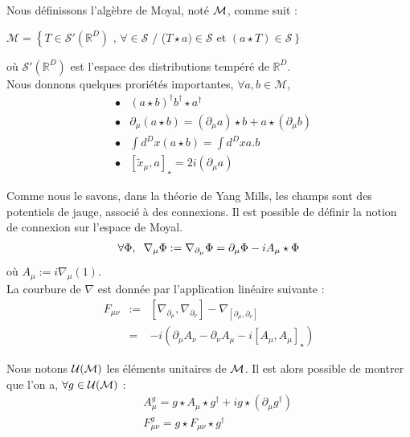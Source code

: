 \documentclass[a4paper,11pt]{article}
\theoremstyle{plain}
\theoremstyle{definition}
\theoremstyle{remark}
\numberwithin{equation}{section}
\numberwithin{equation}{subsection}
\numberwithin{figure}{section}
\begin{document}
\noindent
Nous définissons l'algèbre de Moyal, noté $\cal{M}$, comme suit :
\begin{center}
 $\mathcal{M}  =  \left \{ \right. T \in \mathcal{S}'(\mathbb{R}^{D})$ ,  $\forall \in \mathcal{S}$ /  ($T \star  a) \in \mathcal{S}$   
et $(a \star  T) \in \mathcal{S} \left.  \right \}$
\end{center}
où  $\mathcal{S}'(\mathbb{R}^{D})$ est l'espace des distributions tempéré de $\mathbb{R}^{D}$.\\

\noindent
Nous donnons quelques proriétés importantes, $\forall a,b \in \mathcal{M}$,
\begin{eqnarray}
 &\bullet& (a \star b )^{\dagger}  b^{\dagger}  \star  a^{\dagger}  \\
 &\bullet& \partial_{\mu} (a \star b) = (\partial_{\mu}a) \star b  +  a \star  (\partial_{\mu} b) \\
 &\bullet& \int d^{D}x (a\star b) = \int d^{D}x a.b \\
 &\bullet& [ \tilde{x}_{\mu} ,a ]_{\star} = 2i ( \partial_{\mu} a)
\end{eqnarray}

\noindent
Comme nous le savons, dans la théorie de Yang Mills, les champs sont des potentiels de jauge, associé à des connexions. Il est possible de 
définir la notion de connexion sur l'espace de Moyal.
\begin{eqnarray}
 \forall \Phi, \hspace{2mm}  \nabla_{\mu} \Phi :=   \nabla_{\partial_{\mu}} \Phi  = \partial_{\mu} \Phi - iA_{\mu} \star  \Phi
\end{eqnarray}
où  $A_{\mu} := i \nabla_{\mu}(1)$.\\

\noindent
La courbure de $\nabla$ est donnée par l'application linéaire suivante :
\begin{eqnarray}
 F_{\mu \nu}  &:=&  [ \nabla_{\partial_{\mu}}  , \nabla_{\partial_{\nu}}  ] - \nabla_{[ \partial_{\mu} , \partial_{\nu} ]}   \\
                        &=&  - i ( \partial_{\mu} A_{\nu}  -   \partial_{\nu} A_{\mu}  - i [ A_{\mu} , A_{\mu} ]_{\star}  )
\end{eqnarray}

\noindent
Nous notons $\cal{U}(\cal{M})$ les éléments unitaires de $\cal{M}$. Il est alors possible de montrer que l'on a, $\forall g \in \cal{U}(\cal{M})$ :
\begin{eqnarray}
 && A_{\mu}^{g} = g \star A_{\mu} \star g^{\dagger} + ig \star ( \partial_{\mu} g^{\dagger} )  \\
 && F_{\mu \nu }^{g} = g \star F_{\mu \nu}  \star   g^{\dagger}
\end{eqnarray}
\end{document}
